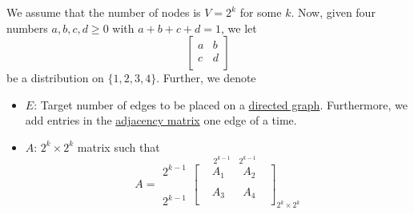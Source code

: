 We assume that the number of nodes is \(V = 2^k\) for some \(k\). Now, given four numbers
\(a, b, c, d \geq 0\) with \(a+b+c+d = 1\), we let
\[
	\begin{bmatrix}
		a & b \\
		c & d \\
	\end{bmatrix}
\]
be a distribution on \(\{1, 2, 3, 4\}\). Further, we denote
\begin{itemize}
	\item \(E\): Target number of edges to be placed on a \hyperref[def:directed-graph]{directed graph}. Furthermore, we add entries in the
	      \hyperref[def:adjacency-matrix]{adjacency matrix} one edge of a time.
	\item \(A\): \(2^k \times 2^k\) matrix such that
	      \[
		      A = \substack{2^{k - 1}\\ \\ \\ \\ 2^{k-1}} \overset{\ 2^{k - 1}\ \ \ \ \ 2^{k-1}}{\begin{bmatrix}
				       & A_1 &  & A_2 & \\
				       &     &  &     & \\
				       & A_3 &  & A_4 & \\
			      \end{bmatrix}}_{2^k\times 2^k}
	      \]
\end{itemize}

